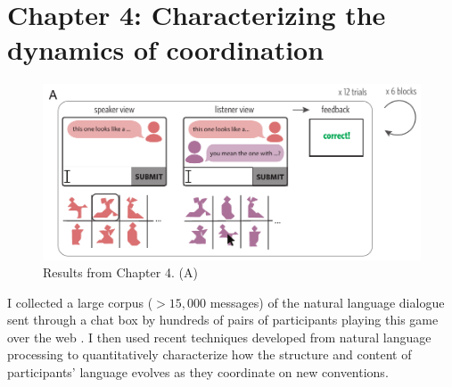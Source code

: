 \documentclass[11pt]{article}
\begin{document}
\section*{Chapter 4: Characterizing the dynamics of coordination} 

\begin{figure}[t!]
\centering
\includegraphics[scale=0.8]{chapter4}
\caption{\small Results from Chapter 4. (A) }
\label{fig:chapter5}
\end{figure}


I collected a large corpus ($> 15,000$ messages) of the natural language dialogue sent through a chat box by hundreds of pairs of participants playing this game over the web \cite{hawkins_convention-formation_2017}.
I then used recent techniques developed from natural language processing to quantitatively characterize how the structure and content of participants' language evolves as they coordinate on new conventions.
\end{document}
